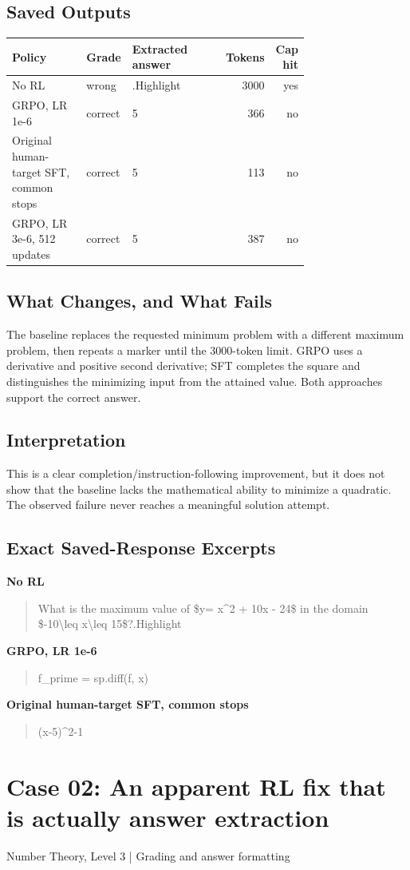 \documentclass[10pt,letterpaper]{article}
\begin{document}
\subsection*{Saved Outputs}
\small\begin{longtable}{p{0.29\linewidth}p{0.10\linewidth}p{0.35\linewidth}rr}\toprule Policy & Grade & Extracted answer & Tokens & Cap hit\\\midrule
No RL & wrong & .Highlight & 3000 & yes\\
GRPO, LR 1e-6 & correct & 5 & 366 & no\\
Original human-target SFT, common stops & correct & 5 & 113 & no\\
GRPO, LR 3e-6, 512 updates & correct & 5 & 387 & no\\
\bottomrule\end{longtable}\normalsize
\subsection*{What Changes, and What Fails}
The baseline replaces the requested minimum problem with a different maximum problem, then repeats a marker until the 3000-token limit. GRPO uses a derivative and positive second derivative; SFT completes the square and distinguishes the minimizing input from the attained value. Both approaches support the correct answer.
\subsection*{Interpretation}
This is a clear completion/instruction-following improvement, but it does not show that the baseline lacks the mathematical ability to minimize a quadratic. The observed failure never reaches a meaningful solution attempt.
\subsection*{Exact Saved-Response Excerpts}
\textbf{No RL}
\begin{quote}\small\raggedright What is the maximum value of \$y= x\textasciicircum{}2 + 10x - 24\$ in the domain \$-10\textbackslash{}leq x\textbackslash{}leq 15\$?.Highlight\end{quote}
\textbf{GRPO, LR 1e-6}
\begin{quote}\small\raggedright f\_prime = sp.diff(f, x)\end{quote}
\textbf{Original human-target SFT, common stops}
\begin{quote}\small\raggedright (x-5)\textasciicircum{}2-1\end{quote}
\clearpage\section*{Case 02: An apparent RL fix that is actually answer extraction}
Number Theory, Level 3 | Grading and answer formatting
\end{document}
